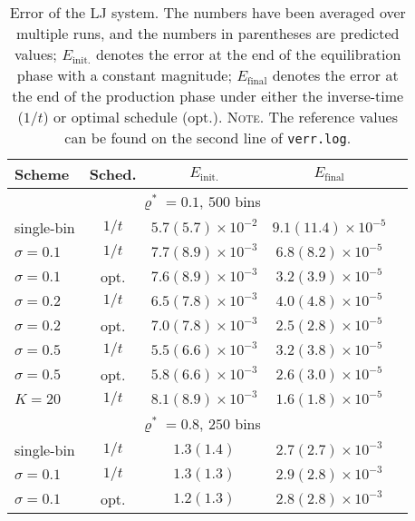 \documentclass[reprint, superscriptaddress, floatfix]{revtex4-1}
\newcommand{\note}[1]{{\color{DarkGreen}\footnotesize \textsc{Note.} #1}}
\newcommand{\Err}{E}
\begin{document}
\begin{table}[h]\footnotesize
  \caption{\label{tab:error_LJ}
    Error of the LJ system.
    The numbers have been averaged over multiple runs,
    and the numbers in parentheses are predicted values;
    $\Err_\mathrm{init.}$
    denotes the error
    at the end of the equilibration phase with a constant magnitude;
    $\Err_\mathrm{final}$
    denotes the error at the end of the production phase under
    either the inverse-time ($1/t$) or optimal schedule (opt.).
    \note{The reference values can be found on the second line of \texttt{verr.log}.}
  }
  \setlength{\tabcolsep}{2pt}
  \renewcommand\arraystretch{1.4}
  \begin{tabular} { l c c c c }
    \hline
    Scheme & Sched. &
    $\Err_\mathrm{init.}$ &
    $\Err_\mathrm{final}$
    \\
    \hline
    \multicolumn{4}{c}{$\varrho^* = 0.1$, $500$ bins} \\
    \hline
    single-bin & $1/t$
    & $5.7(5.7)\times10^{-2}$
    & $9.1(11.4)\times10^{-5}$
    \\
    $\sigma=0.1$ & $1/t$
    & $7.7(8.9)\times10^{-3}$
    & $6.8(8.2)\times10^{-5}$
    \\
    $\sigma=0.1$ & opt.
    & $7.6(8.9)\times10^{-3}$
    & $3.2(3.9)\times10^{-5}$
    \\
    $\sigma=0.2$ & $1/t$
    & $6.5(7.8)\times10^{-3}$
    & $4.0(4.8)\times10^{-5}$
    \\
    $\sigma=0.2$ & opt.
    & $7.0(7.8)\times10^{-3}$
    & $2.5(2.8)\times10^{-5}$
    \\
    $\sigma=0.5$ & $1/t$
    & $5.5(6.6)\times10^{-3}$
    & $3.2(3.8)\times10^{-5}$
    \\
    $\sigma=0.5$ & opt.
    & $5.8(6.6)\times10^{-3}$
    & $2.6(3.0)\times10^{-5}$
    \\
    $K=20$ & $1/t$
    & $8.1(8.9)\times10^{-3}$
    & $1.6(1.8)\times10^{-5}$
    \\
    \hline
    \multicolumn{4}{c}{$\varrho^* = 0.8$, $250$ bins} \\
    \hline
    single-bin & $1/t$
    & $1.3(1.4)$
    & $2.7(2.7)\times10^{-3}$
    \\
    $\sigma=0.1$ & $1/t$
    & $1.3(1.3)$
    & $2.9(2.8)\times10^{-3}$
    \\
    $\sigma=0.1$ & opt.
    & $1.2(1.3)$
    & $2.8(2.8)\times10^{-3}$
    \\

\end{tabular}
\end{table}
\end{document}
